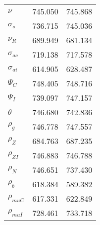 \begin{center}
\begin{longtable}{lcc}
$ \nu                     $	 & 	     745.050	 & 	     745.868 \\ 
$ \sigma_s                $	 & 	     736.715	 & 	     745.036 \\ 
$ {\nu_R}                 $	 & 	     689.949	 & 	     681.134 \\ 
$ {\sigma_{ac}}           $	 & 	     719.138	 & 	     717.578 \\ 
$ {\sigma_{ai}}           $	 & 	     614.905	 & 	     628.487 \\ 
$ {\Psi_C}                $	 & 	     748.405	 & 	     748.716 \\ 
$ {\Psi_I}                $	 & 	     739.097	 & 	     747.157 \\ 
$ {\theta}                $	 & 	     746.680	 & 	     742.836 \\ 
$ {\rho_g}                $	 & 	     746.778	 & 	     747.557 \\ 
$ {\rho_Z}                $	 & 	     684.763	 & 	     687.235 \\ 
$ {\rho_{ZI}}             $	 & 	     746.883	 & 	     746.788 \\ 
$ {\rho_N}                $	 & 	     746.651	 & 	     737.430 \\ 
$ {\rho_b}                $	 & 	     618.384	 & 	     589.382 \\ 
$ {\rho_{muC}}            $	 & 	     617.331	 & 	     622.849 \\ 
$ {\rho_{muI}}            $	 & 	     728.461	 & 	     733.718 \\ 
\end{longtable}
 \end{center}

